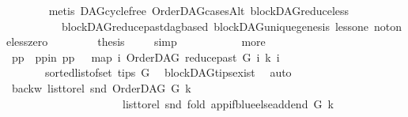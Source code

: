 \begin{isabellebody}
\ \ \ \ \ \ \isamarkupfalse%
\ {\isacharparenleft}{\kern0pt}metis\ DAG{\isachardot}{\kern0pt}cycle{\isacharunderscore}{\kern0pt}free\ OrderDAG{\isacharunderscore}{\kern0pt}casesAlt\ blockDAG{\isachardot}{\kern0pt}reduce{\isacharunderscore}{\kern0pt}less\isanewline
\ \ \ \ \ \ \ \ \ \ blockDAG{\isachardot}{\kern0pt}reduce{\isacharunderscore}{\kern0pt}past{\isacharunderscore}{\kern0pt}dagbased\ blockDAG{\isachardot}{\kern0pt}unique{\isacharunderscore}{\kern0pt}genesis\ less{\isacharunderscore}{\kern0pt}one\ not{\isacharunderscore}{\kern0pt}one{\isacharunderscore}{\kern0pt}less{\isacharunderscore}{\kern0pt}zero{\isacharparenright}{\kern0pt}\ \isanewline
\ \ \ \ \isamarkupfalse%
\ \isamarkupfalse%
\ {\isacharquery}{\kern0pt}thesis\ \isamarkupfalse%
\ {}\ \isamarkupfalse%
\ simp\isanewline
\ \ \isamarkupfalse%
\ \ \isanewline
\ \ \ \ \isamarkupfalse%
\ more\isanewline
\ \ \ \ \isamarkupfalse%
\ pp\ \ pp{\isacharunderscore}{\kern0pt}in{\isacharcolon}{\kern0pt}\ {\isachardoublequoteopen}pp\ {\isacharequal}{\kern0pt}\ \ {\isacharparenleft}{\kern0pt}map\ {\isacharparenleft}{\kern0pt}{\isasymlambda}i{\isachardot}{\kern0pt}\ {\isacharparenleft}{\kern0pt}OrderDAG\ {\isacharparenleft}{\kern0pt}reduce{\isacharunderscore}{\kern0pt}past\ G\ i{\isacharparenright}{\kern0pt}\ k{\isacharcomma}{\kern0pt}\ i{\isacharparenright}{\kern0pt}{\isacharparenright}{\kern0pt}\isanewline
\ \ \ \ \ \ \ {\isacharparenleft}{\kern0pt}sorted{\isacharunderscore}{\kern0pt}list{\isacharunderscore}{\kern0pt}of{\isacharunderscore}{\kern0pt}set\ {\isacharparenleft}{\kern0pt}tips\ G{\isacharparenright}{\kern0pt}{\isacharparenright}{\kern0pt}{\isacharparenright}{\kern0pt}{\isachardoublequoteclose}\ \isamarkupfalse%
\ blockDAG{\isachardot}{\kern0pt}tips{\isacharunderscore}{\kern0pt}exist\ \isamarkupfalse%
\ auto\isanewline
\ \ \ \ \isamarkupfalse%
\ backw{\isacharcolon}{\kern0pt}\ {\isachardoublequoteopen}list{\isacharunderscore}{\kern0pt}to{\isacharunderscore}{\kern0pt}rel\ {\isacharparenleft}{\kern0pt}snd\ {\isacharparenleft}{\kern0pt}OrderDAG\ G\ k{\isacharparenright}{\kern0pt}{\isacharparenright}{\kern0pt}\ {\isacharequal}{\kern0pt}\ \isanewline
\ \ \ \ \ \ \ \ \ \ \ \ \ \ \ \ \ \ \ \ \ list{\isacharunderscore}{\kern0pt}to{\isacharunderscore}{\kern0pt}rel\ {\isacharparenleft}{\kern0pt}snd\ {\isacharparenleft}{\kern0pt}fold\ {\isacharparenleft}{\kern0pt}app{\isacharunderscore}{\kern0pt}if{\isacharunderscore}{\kern0pt}blue{\isacharunderscore}{\kern0pt}else{\isacharunderscore}{\kern0pt}add{\isacharunderscore}{\kern0pt}end\ G\ k{\isacharparenright}{\kern0pt}\isanewline

\end{isabellebody}
